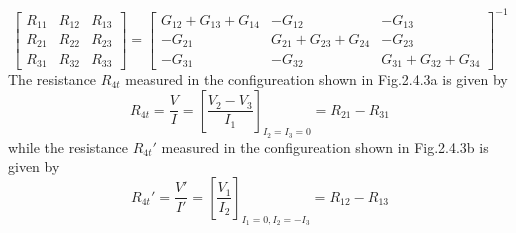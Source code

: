 \documentclass[11pt,a4paper]{book}
\theoremstyle{plain}
\theoremstyle{definition}
\theoremstyle{remark}
\begin{document}
\begin{equation}
    \begin{bmatrix}
        R_{11} & R_{12} & R_{13} \\
        R_{21} & R_{22} & R_{23} \\
        R_{31} & R_{32} & R_{33}
    \end{bmatrix}
    =
    \begin{bmatrix}
        G_{12} + G_{13} + G_{14} & -G_{12} & -G_{13} \\
        -G_{21} & G_{21} + G_{23} + G_{24} & -G_{23} \\
        -G_{31} & -G_{32} & G_{31} + G_{32} + G_{34}
    \end{bmatrix}^{-1}
\end{equation}
The resistance $R_{4t}$ measured in the configureation shown in Fig.2.4.3a is given by
\begin{equation}
    R_{4t} = \frac{V}{I} = \left[\frac{V_2-V_3}{I_1}\right]_{I_2=I_3=0} = R_{21}-R_{31}
\end{equation}
while the resistance $R_{4t}'$ measured in the configureation shown in Fig.2.4.3b is given by
\begin{equation}
    R_{4t}' = \frac{V'}{I'} = \left[\frac{V_1}{I_2}\right]_{I_1=0, I_2=-I_3} = R_{12}-R_{13}
\end{equation}
\end{document}
